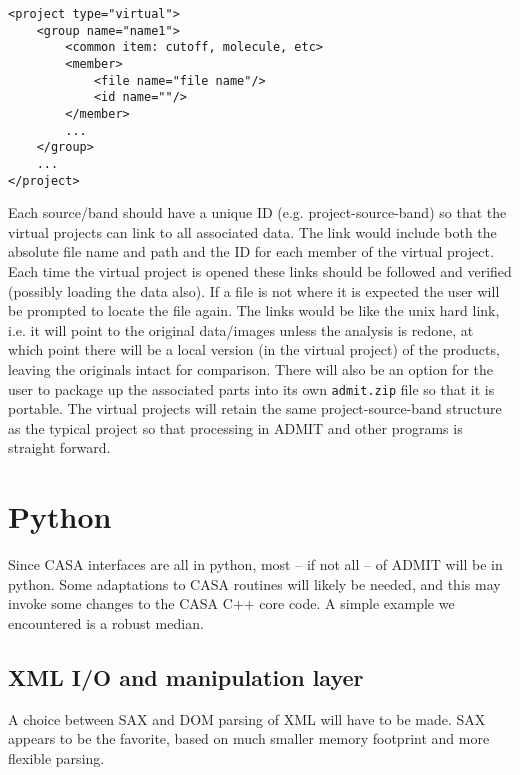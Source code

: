 \documentclass{article}
\begin{document}
\begin{verbatim}
<project type="virtual">
    <group name="name1">
    	<common item: cutoff, molecule, etc>
    	<member>
    		<file name="file name"/>
    		<id name=""/>
    	</member>
    	...
    </group>
    ...
</project>
\end{verbatim}

Each source/band should have a unique ID (e.g. project-source-band) so
that the virtual projects can link to all associated data. The link
would include both the absolute file name and path and the ID for each
member of the virtual project. Each time the virtual project is opened
these links should be followed and verified (possibly loading the data
also). If a file is not where it is expected the user will be prompted
to locate the file again. The links would be like the unix hard link,
i.e. it will point to the original data/images unless the analysis is
redone, at which point there will be a local version (in the virtual
project) of the products, leaving the originals intact for
comparison. There will also be an option for the user to package up
the associated parts into its own {\tt admit.zip} file so that it is
portable. The virtual projects will retain the same
project-source-band structure as the typical project so that
processing in ADMIT and other programs is straight forward.

\section{Python}

Since CASA interfaces are all in python, most -- if not all -- of
ADMIT will be in python. Some adaptations to CASA routines will
likely be needed, and this may invoke some changes to the CASA
C++ core code. A simple example we encountered is
a robust median.

\subsection{XML I/O and manipulation layer}

A choice between SAX and DOM parsing of XML will have to be made.
SAX appears to be the favorite, based on much smaller memory
footprint and more flexible parsing.



% 
% 
\end{document}
